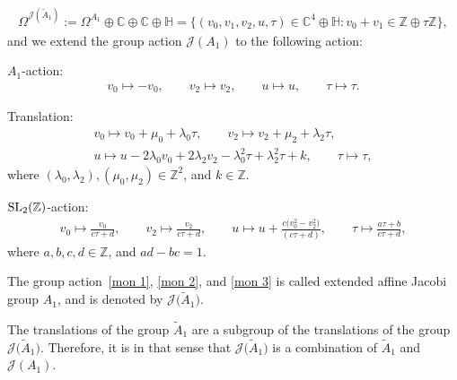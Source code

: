 \documentclass[10pt,a4paper]{amsart}
\numberwithin{equation}{section}
\newcommand{\Ja}{\mathcal{J}}
\begin{document}
\begin{gather*}
\Omega^{\Ja(\tilde A_1)}:=\Omega^{A_1}\oplus\mathbb{C}\oplus\mathbb{C}\oplus\mathbb{H}=\big\{(v_0,v_1,v_2,u,\tau) \in \mathbb{C}^4\oplus\mathbb{H}\colon v_0+v_1\in \mathbb{Z}\oplus\tau\mathbb{Z} \big\},
\end{gather*}
and we extend the group action $\Ja(A_1)$ to the following action:

$A_1$-action:
\begin{gather}\label{mon 1}
v_0\mapsto -v_0,\qquad
v_2\mapsto v_2,\qquad
u\mapsto u,\qquad
\tau\mapsto\tau.
\end{gather}

Translation:
\begin{gather}
v_0\mapsto v_0+\mu_0+\lambda_0\tau,\qquad
v_2\mapsto v_2+\mu_2+\lambda_2\tau,\nonumber
\\
u\mapsto u-2\lambda_0v_0+2\lambda_2v_2-\lambda_0^2\tau+\lambda_2^2\tau+k,\qquad
\tau\mapsto\tau,\label{mon 2}
\end{gather}
where $(\lambda_0,\lambda_2), (\mu_0,\mu_2) \in \mathbb{Z}^2$, and $k \in \mathbb{Z}$.

${\rm SL}_2(\mathbb{Z})$-action:
\begin{gather}\label{mon 3}
v_0\mapsto \frac{v_0}{c\tau+d},\qquad
v_2\mapsto \frac{v_2}{c\tau+d},\qquad
u\mapsto u+\frac{c\big(v_0^2-v_2^2\big)}{(c\tau+d)},\qquad
\tau\mapsto\frac{a\tau+b}{c\tau+d},
\end{gather}
where $a,b,c,d\in \mathbb{Z}$, and $ad-bc=1$.

The group action~\eqref{mon 1}, \eqref{mon 2}, and \eqref{mon 3} is called extended affine Jacobi group $A_1$, and is denoted by $\Ja\big(\tilde A_1\big)$.

\begin{Remark}\sloppy
 The translations of the group $\tilde A_1$ are a subgroup of the translations of the group~$\Ja\big(\tilde A_1\big)$. Therefore, it is in that sense that $\Ja\big(\tilde A_1\big)$ is a combination of $\tilde A_1$ and $\Ja(A_1)$.
\end{Remark}
\end{document}
